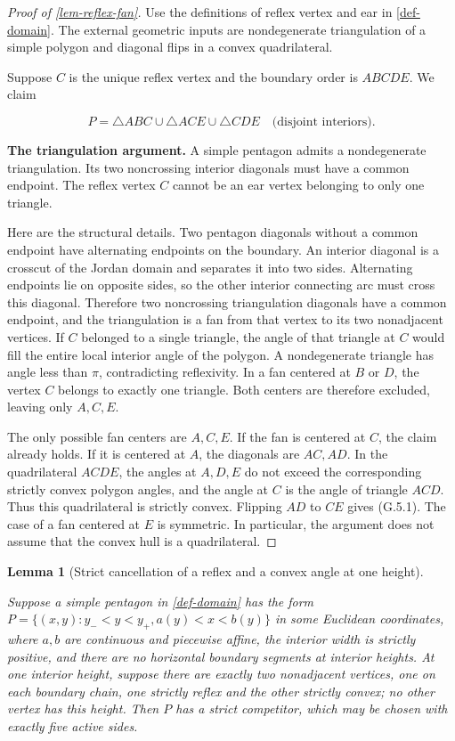 \documentclass[11pt,a4paper]{article}
\theoremstyle{proofmanuscript}
\newtheorem{lemma}[theorem]{Lemma}
\begin{document}
\begin{proof}[Proof of \ref{lem-reflex-fan}]

Use the definitions of reflex vertex and ear in \ref{def-domain}. The external geometric inputs are nondegenerate triangulation of a simple polygon and diagonal flips in a convex quadrilateral.

Suppose \(C\) is the unique reflex vertex and the boundary order is \(A B C D E\). We claim

\[
P=\triangle ABC\cup\triangle ACE\cup\triangle CDE
\quad\text{(disjoint interiors)}.
\tag{G.5.1}
\]

\textbf{The triangulation argument.} A simple pentagon admits a nondegenerate triangulation. Its two noncrossing interior diagonals must have a common endpoint. The reflex vertex \(C\) cannot be an ear vertex belonging to only one triangle.

Here are the structural details. Two pentagon diagonals without a common endpoint have alternating endpoints on the boundary. An interior diagonal is a crosscut of the Jordan domain and separates it into two sides. Alternating endpoints lie on opposite sides, so the other interior connecting arc must cross this diagonal. Therefore two noncrossing triangulation diagonals have a common endpoint, and the triangulation is a fan from that vertex to its two nonadjacent vertices. If \(C\) belonged to a single triangle, the angle of that triangle at \(C\) would fill the entire local interior angle of the polygon. A nondegenerate triangle has angle less than \(\pi\), contradicting reflexivity. In a fan centered at \(B\) or \(D\), the vertex \(C\) belongs to exactly one triangle. Both centers are therefore excluded, leaving only \(A,C,E\).

The only possible fan centers are \(A,C,E\). If the fan is centered at \(C\), the claim already holds. If it is centered at \(A\), the diagonals are \(AC,AD\). In the quadrilateral \(ACDE\), the angles at \(A,D,E\) do not exceed the corresponding strictly convex polygon angles, and the angle at \(C\) is the angle of triangle \(ACD\). Thus this quadrilateral is strictly convex. Flipping \(AD\) to \(CE\) gives (G.5.1). The case of a fan centered at \(E\) is symmetric. In particular, the argument does not assume that the convex hull is a quadrilateral.

\end{proof}

\begin{lemma}[Strict cancellation of a reflex and a convex angle at one height]\label{lem-steiner}

Suppose a simple pentagon in \ref{def-domain} has the form \(P=\{(x,y):y_-<y<y_+,a(y)<x<b(y)\}\) in some Euclidean coordinates, where \(a,b\) are continuous and piecewise affine, the interior width is strictly positive, and there are no horizontal boundary segments at interior heights. At one interior height, suppose there are exactly two nonadjacent vertices, one on each boundary chain, one strictly reflex and the other strictly convex; no other vertex has this height. Then \(P\) has a strict competitor, which may be chosen with exactly five active sides.

\end{lemma}
\end{document}
